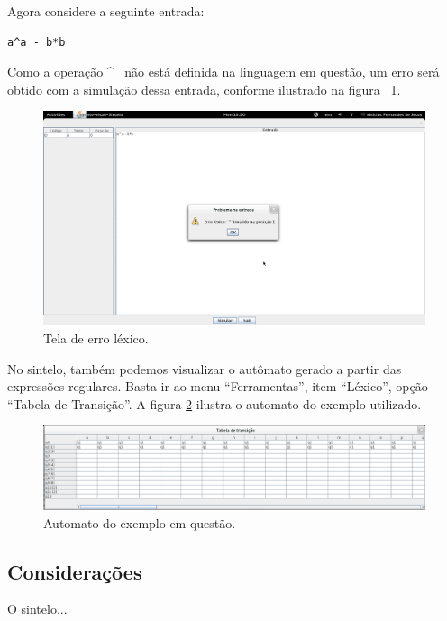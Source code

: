 Agora considere a seguinte entrada:
\begin{verbatim}
a^a - b*b
\end{verbatim}

Como a operação \^~ não está definida na linguagem em questão, um erro será obtido com a simulação dessa entrada, conforme ilustrado na figura ~\ref{sintelo-lexico-erro}. 

\begin{figure}[ht!]
	\centering
	\includegraphics[scale=0.28]{imgs/sintelo-lexico-erro}
	\caption{Tela de erro léxico.}
	\label{sintelo-lexico-erro}
\end{figure}

No sintelo, também podemos visualizar o autômato gerado a partir das expressões regulares. Basta ir ao menu ``Ferramentas'', item ``Léxico'', opção ``Tabela de Transição''. A figura \ref{sintelo-lexico-automatan} ilustra o automato do exemplo utilizado.

\begin{figure}[ht!]
	\centering
	\includegraphics[scale=0.28]{imgs/sintelo-lexico-automatan}
	\caption{Automato do exemplo em questão.}
	\label{sintelo-lexico-automatan}
\end{figure}

\subsection{Considerações} %
\label{sub:consideracoes}
O sintelo...

